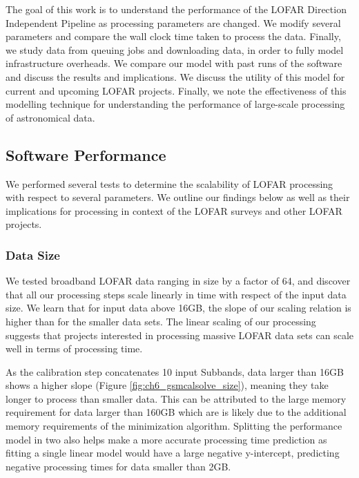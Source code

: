 
The goal of this work is to understand the performance of the LOFAR Direction Independent Pipeline as processing parameters are changed. We modify several parameters and compare the wall clock time taken to process the data. Finally, we study data from queuing jobs and downloading data, in order to fully model infrastructure overheads. We compare our model with past runs of the software and discuss the results and implications. We discuss the utility of this model for current and upcoming LOFAR projects. Finally, we note the effectiveness of this modelling technique for understanding the performance of large-scale processing of astronomical data.

\subsection{Software Performance}

We performed several tests to determine the scalability of LOFAR processing with respect to several parameters. We outline our findings below as well as their implications for processing in context of the LOFAR surveys and other LOFAR projects. 

\subsubsection{Data Size}
We tested broadband LOFAR data ranging in size by a factor of 64, and discover that all our processing steps scale linearly in time with respect of the input data size. We learn that for input data above 16GB, the slope of our scaling relation is higher than for the smaller data sets. The linear scaling of our processing suggests that projects interested in processing massive LOFAR data sets can scale well in terms of processing time. 

As the calibration step concatenates 10 input Subbands, data larger than 16GB shows a higher slope (Figure \ref{fig:ch6_gsmcalsolve_size}), meaning they take longer to process than smaller data. This can be attributed to the large memory requirement for data larger than 160GB which are is likely due to the additional memory requirements of the minimization algorithm.  Splitting the performance model in two also helps make a more accurate processing time prediction as fitting a single linear model would have a large negative y-intercept, predicting negative processing times for data smaller than 2GB. 

